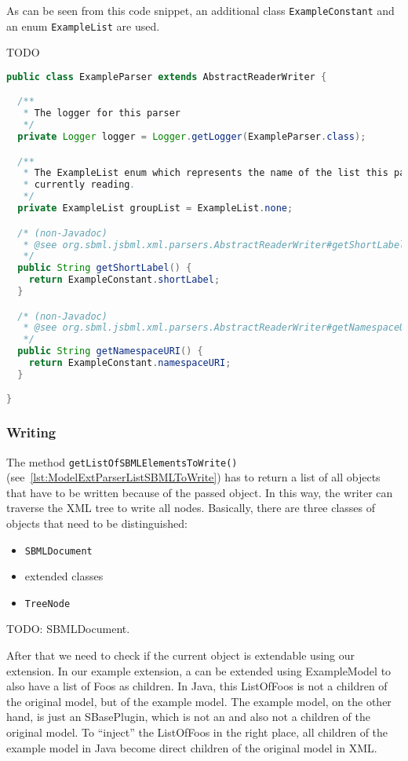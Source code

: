 As can be seen from this code snippet, an additional class
\texttt{ExampleConstant} and an enum \texttt{ExampleList} are used.

TODO


\begin{lstlisting}[language=Java,caption={The first part of the parser for the extension},label={lst:ModelExtParserClass}]
public class ExampleParser extends AbstractReaderWriter {

  /**
   * The logger for this parser
   */
  private Logger logger = Logger.getLogger(ExampleParser.class);

  /**
   * The ExampleList enum which represents the name of the list this parser is
   * currently reading.
   */
  private ExampleList groupList = ExampleList.none;

  /* (non-Javadoc)
   * @see org.sbml.jsbml.xml.parsers.AbstractReaderWriter#getShortLabel()
   */
  public String getShortLabel() {
    return ExampleConstant.shortLabel;
  }

  /* (non-Javadoc)
   * @see org.sbml.jsbml.xml.parsers.AbstractReaderWriter#getNamespaceURI()
   */
  public String getNamespaceURI() {
    return ExampleConstant.namespaceURI;
  }

}
\end{lstlisting}


\subsubsection{Writing}

The method \texttt{getListOfSBMLElementsToWrite()}
(see~\vref{lst:ModelExtParserListSBMLToWrite}) has to return a list of all
objects that have to be written because of the passed object.
In this way, the writer can traverse the XML tree to write all nodes.
Basically, there are three classes of objects that need to be distinguished:
\begin{itemize}
 \item \texttt{SBMLDocument}
 \item extended classes
 \item \texttt{TreeNode}
\end{itemize}

TODO: SBMLDocument.

After that we need to check if the current object is extendable using our extension.
In our example extension, a \Model{} can be extended using ExampleModel to also
have a list of Foos as children.
In Java, this ListOfFoos is not a children of the original model, but of the
example model.
The example model, on the other hand, is just an SBasePlugin, which is not an
\SBase{} and also not a children of the original model.
To ``inject'' the ListOfFoos in the right place, all children of the example
model in Java become direct children of the original model in XML.

